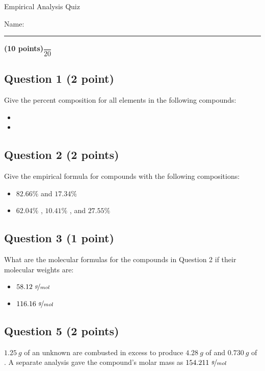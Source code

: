 \documentclass[12pt, letterpaper]{memoir}
\begin{document}
	\begin{center}
		{\large Empirical Analysis Quiz}
	\end{center}
	{\large Name: \rule[-1mm]{4in}{.1pt} {\bfseries (10 points)}\hspace{4em}$\dfrac{~}{20}$} 
	
	\subsection*{Question 1 (2 point)}
	Give the percent composition for all elements in the following compounds:
	\begin{itemize}
		\item \vspace{0.5em} 
		\item \vspace{2em} 
	\end{itemize}
	
	\vspace{1.5em}
	\subsection*{Question 2 (2 points)}
	Give the empirical formula for compounds with the following compositions:
	
	\begin{itemize}
		\item \vspace{0.5em} $82.66\%$  and $17.34\%$ 
		\item \vspace{6em} $62.04\%$ , $10.41\%$ , and $27.55\%$ 
	\end{itemize}
	
	
	\vspace{6em}
	\subsection*{Question 3 (1 point)}
	What are the molecular formulas for the compounds in Question 2 if their molecular weights are:
	\begin{itemize}
		\item \vspace{0.5em} $58.12~\nicefrac{g}{mol}$
		\item \vspace{1.5em} $116.16~\nicefrac{g}{mol}$
	\end{itemize}
	 

	\subsection*{Question 5 (2 points)}
	$1.25~g$ of an unknown are combusted in excess  to produce $4.28~g$ of  and $0.730~g$ of . A separate analysis gave the compound's molar mass as $154.211~\nicefrac{g}{mol}$
	
\end{document}
